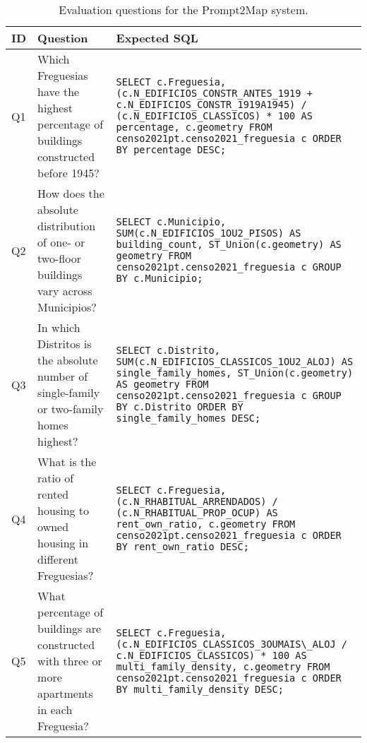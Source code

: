 {\scriptsize



\bgroup
{}
\begin{xltabular}{\textwidth}{|p{0.05\textwidth}p{0.3\textwidth}p{0.55\textwidth}|}
    \caption{Evaluation questions for the Prompt2Map system.}
    \label{tab:evaluation_questions}\\
    \toprule
       ID & Question & Expected SQL \\
    \midrule
{}\label{question:1}Q1 & Which Freguesias have the highest percentage of buildings constructed before 1945? & \lstinline!SELECT c.Freguesia, (c.N_EDIFICIOS_CONSTR_ANTES_1919 + c.N_EDIFICIOS_CONSTR_1919A1945) / (c.N_EDIFICIOS_CLASSICOS) * 100 AS percentage, c.geometry FROM censo2021pt.censo2021_freguesia c ORDER BY percentage DESC;! \\
\label{question:2}Q2 & How does the absolute distribution of one- or two-floor buildings vary across Municipios? & \lstinline!SELECT c.Municipio, SUM(c.N_EDIFICIOS_1OU2_PISOS) AS building_count, ST_Union(c.geometry) AS geometry FROM censo2021pt.censo2021_freguesia c GROUP BY c.Municipio;! \\
\label{question:3}Q3 & In which Distritos is the absolute number of single-family or two-family homes highest? & \lstinline!SELECT c.Distrito, SUM(c.N_EDIFICIOS_CLASSICOS_1OU2_ALOJ) AS single_family_homes, ST_Union(c.geometry) AS geometry FROM censo2021pt.censo2021_freguesia c GROUP BY c.Distrito ORDER BY single_family_homes DESC;! \\
\label{question:4}Q4 & What is the ratio of rented housing to owned housing in different Freguesias? & \lstinline!SELECT c.Freguesia, (c.N_RHABITUAL_ARRENDADOS) / (c.N_RHABITUAL_PROP_OCUP) AS rent_own_ratio, c.geometry FROM censo2021pt.censo2021_freguesia c ORDER BY rent_own_ratio DESC;! \\
\label{question:5}Q5 & What percentage of buildings are constructed with three or more apartments in each Freguesia? & \lstinline!SELECT c.Freguesia, (c.N_EDIFICIOS_CLASSICOS_3OUMAIS\_ALOJ / c.N_EDIFICIOS_CLASSICOS) * 100 AS multi_family_density, c.geometry FROM censo2021pt.censo2021_freguesia c ORDER BY multi_family_density DESC;! \\

\end{xltabular}}
